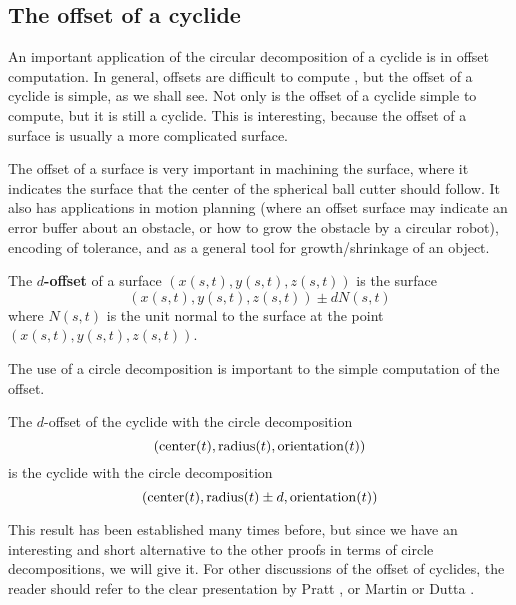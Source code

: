 
\subsection{The offset of a cyclide}
\label{offset}

An important application of the circular decomposition of a cyclide
is in offset computation.
In general, offsets are difficult to compute \cite{FAR86,FN90b,FN90a},
but the offset of a cyclide is simple, as we shall see.
Not only is the offset of a cyclide simple to compute, but
it is still a cyclide.
This is interesting, because the offset of a surface is usually a 
more complicated surface.

The offset of a surface is very important in machining the surface,
where it indicates the surface that the center of the spherical ball cutter
should follow.
It also has applications in motion planning (where an offset surface
may indicate an error buffer about an obstacle, or how to grow the obstacle
by a circular robot), encoding of tolerance, and as a general tool for
growth/shrinkage of an object.

\begin{defn2}
The {\bf $d$-offset} of a surface $(x(s,t),y(s,t),z(s,t))$ is the surface
\[ 
	(x(s,t),y(s,t),z(s,t)) \pm d N(s,t)
\]
where $N(s,t)$ is the unit normal
to the surface at the point $(x(s,t),y(s,t),z(s,t))$.
\end{defn2}

The use of a circle decomposition is important to the 
simple computation of the offset.


\begin{theorem}
\label{thm:offset}
The $d$-offset of the cyclide 
with the circle decomposition
\[ ({\rm center}(t), {\rm radius}(t), {\rm orientation}(t)) \]
is the cyclide with the circle decomposition
\[ ({\rm center}(t), {\rm radius}(t) \pm d, {\rm orientation}(t)) \]
\end{theorem}

This result has been established many times before,
but since we have an interesting and short alternative to the other proofs
in terms of circle decompositions, we will give it.
For other discussions of the offset of cyclides, 
the reader should refer to the clear presentation by Pratt \cite{P89}, 
or Martin \cite{MAR82} or Dutta \cite{Dutta89}.

